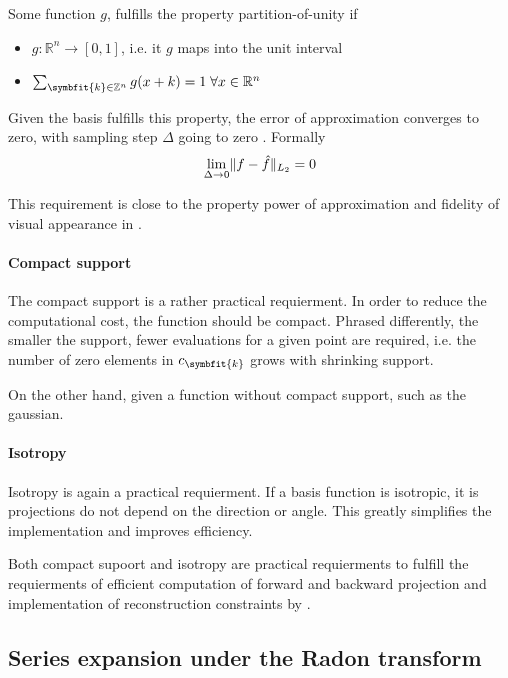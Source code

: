 Some function $g$, fulfills the property partition-of-unity if
\begin{itemize}
    \item $g: \mathbb{R}^n \to [0, 1]$, i.e. it $g$ maps into the unit interval
    \item $\sum_{\symbfit{k} \in \mathbb{Z}^n} g(x + k) = 1 \; \forall x \in \mathbb{R}^n$
\end{itemize}
Given the basis fulfills this property, the error of approximation converges to zero, with sampling 
step $\Delta$ going to zero \cite{nilchian_optimized_2015}. Formally
\begin{equation}
    \lim_{\Delta \to 0} \lVert f - \hat{f}\rVert_{L_2} = 0
\end{equation}

This requirement is close to the property power of approximation and fidelity of visual
appearance in \cite{hanson_local_1985}.

\paragraph{Compact support}

The compact support is a rather practical requierment. In order to reduce the computational cost,
the function should be compact. Phrased differently, the smaller the support, fewer evaluations
    for a given point are required, i.e. the number of zero elements in $c_{\symbfit{k}}$ grows with shrinking
support.

On the other hand, given a function without compact support, such as the gaussian.

\paragraph{Isotropy}

Isotropy is again a practical requierment. If a basis function is isotropic, it is projections
do not depend on the direction or angle. This greatly simplifies the implementation and improves efficiency.

Both compact supoort and isotropy are practical requierments to fulfill the requierments of
efficient computation of forward and backward projection and implementation of reconstruction constraints
by \cite{hanson_local_1985}.

\subsection{Series expansion under the Radon transform}

